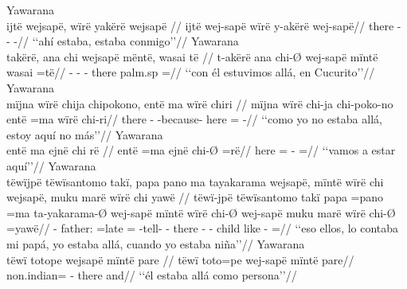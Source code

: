\documentclass{memoir}
\begin{document}
\pex\label{loc-main-aff-part-cop-nsubj}    \a Yawarana\\
    \label{convfemgrme-292}        \begingl
        \glpreamble ijtë wejsapë, wïrë yakërë wejsapë //
        \gla ijtë wej-sapë wïrë y-akërë wej-sapë//
        \glb there -  - -//
            \glft ‘‘ahí estaba, estaba conmigo’’//  
        \endgl 
    \a Yawarana\\
    \label{histgrme-17}        \begingl
        \glpreamble takërë, ana chi wejsapë mëntë, wasai të //
        \gla t-akërë ana chi-Ø wej-sapë mïntë wasai =të//
        \glb {}-  - - there palm.sp =//
            \glft ‘‘con él estuvimos allá, en Cucurito’’//  
        \endgl 
    \a Yawarana\\
    \label{convamgu-99}        \begingl
        \glpreamble mïjna wïrë chija chipokono, entë ma wïrë chiri //
        \gla mïjna wïrë chi-ja chi-poko-no entë =ma wïrë chi-ri//
        \glb there  - -because- here =  -//
            \glft ‘‘como yo no estaba allá, estoy aquí no más’’//  
        \endgl 
    \a Yawarana\\
    \label{convamgu-138}        \begingl
        \glpreamble entë ma ejnë chi rë //
        \gla entë =ma ejnë chi-Ø =rë//
        \glb here =  - =//
            \glft ‘‘vamos a estar aquí’’//  
        \endgl 
    \a Yawarana\\
    \label{convhistfamsjm-92}        \begingl
        \glpreamble tëwïjpë tëwïsantomo takï, papa pano ma tayakarama wejsapë, mïntë wïrë chi wejsapë, muku marë wïrë chi yawë //
        \gla tëwï-jpë tëwïsantomo takï papa =pano =ma ta-yakarama-Ø wej-sapë mïntë wïrë chi-Ø wej-sapë muku marë wïrë chi-Ø =yawë//
        \glb {}-   father: =late = -tell- - there  - - child like  - =//
            \glft ‘‘eso ellos, lo contaba mi papá, yo estaba allá, cuando yo estaba niña’’//  
        \endgl 
    \a Yawarana\\
    \label{ctorosq-17}        \begingl
        \glpreamble tëwï totope wejsapë mïntë pare //
        \gla tëwï toto=pe wej-sapë mïntë pare//
        \glb {} non.indian= - there and//
            \glft ‘‘él estaba allá como persona’’//  
\end{document}
